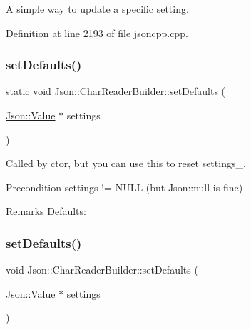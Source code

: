 A simple way to update a specific setting. 

Definition at line 2193 of file jsoncpp.\+cpp.

\hypertarget{class_json_1_1_char_reader_builder_a0ddbea7a0af6da9feea922fbe4e5d6c6}{}\label{class_json_1_1_char_reader_builder_a0ddbea7a0af6da9feea922fbe4e5d6c6} 
\subsubsection{\texorpdfstring{set\+Defaults()}{setDefaults()}\hspace{0.1cm}{\footnotesize\ttfamily [1/2]}}
{\footnotesize\ttfamily static void Json\+::\+Char\+Reader\+Builder\+::set\+Defaults (\begin{DoxyParamCaption}\item[{\hyperlink{class_json_1_1_value}{Json\+::\+Value} $\ast$}]{settings }\end{DoxyParamCaption})\hspace{0.3cm}{\ttfamily [static]}}

Called by ctor, but you can use this to reset settings\+\_\+. \begin{DoxyPrecond}{Precondition}
\textquotesingle{}settings\textquotesingle{} != N\+U\+LL (but Json\+::null is fine) 
\end{DoxyPrecond}
\begin{DoxyRemark}{Remarks}
Defaults\+: 
\begin{DoxyCodeInclude}
\end{DoxyCodeInclude}

\end{DoxyRemark}
\hypertarget{class_json_1_1_char_reader_builder_a03ff031e06aabff989ab4addc87294ab}{}\label{class_json_1_1_char_reader_builder_a03ff031e06aabff989ab4addc87294ab} 
\subsubsection{\texorpdfstring{set\+Defaults()}{setDefaults()}\hspace{0.1cm}{\footnotesize\ttfamily [2/2]}}
{\footnotesize\ttfamily void Json\+::\+Char\+Reader\+Builder\+::set\+Defaults (\begin{DoxyParamCaption}\item[{\hyperlink{class_json_1_1_value}{Json\+::\+Value} $\ast$}]{settings }\end{DoxyParamCaption})\hspace{0.3cm}{\ttfamily [static]}}

